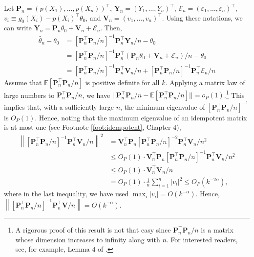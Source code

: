 \documentclass[10.5pt, A4paper, openany, uplatex]{book}
\newcommand{\mbf}{\mathbf}
\newcommand{\mcl}{\mathcal}
\newcommand{\eps}{\varepsilon}
\newcommand{\E}{\mathbb{E}}
\renewcommand{\hat}{\widehat}
\numberwithin{equation}{section}
\begin{document}
Let $\mbf{P}_n = (p(X_1), \ldots, p(X_n))^\top$, $\mbf{Y}_n = (Y_1, \ldots, Y_n)^\top$, $\mcl{E}_n = (\eps_1, \ldots, \eps_n)^\top$, $v_i \equiv g_0(X_i) - p(X_i)^\top \theta_0$, and $\mbf{V}_n = (v_1, \ldots , v_n)^\top$.
Using these notations, we can write $\mbf{Y}_n = \mbf{P}_n \theta_0 + \mbf{V}_n + \mcl{E}_n$.
Then,
\begin{align*}
	\hat \theta_n - \theta_0 
	& = \left[\mbf{P}_n^\top \mbf{P}_n /n \right]^{-1}\mbf{P}_n^\top \mbf{Y}_n /n - \theta_0 \\
	& = \left[\mbf{P}_n^\top \mbf{P}_n /n \right]^{-1}\mbf{P}_n^\top (\mbf{P}_n \theta_0 + \mbf{V}_n + \mcl{E}_n) /n - \theta_0 \\
	& = \left[\mbf{P}_n^\top \mbf{P}_n /n \right]^{-1}\mbf{P}_n^\top \mbf{V}_n /n + \left[\mbf{P}_n^\top \mbf{P}_n /n \right]^{-1}\mbf{P}_n^\top \mcl{E}_n /n 
\end{align*}
Assume that $\E[\mbf{P}_n^\top \mbf{P}_n /n]$ is positive definite for all $k$.
Applying a matrix law of large numbers to $\mbf{P}_n^\top \mbf{P}_n /n$, we have $||\mbf{P}_n^\top \mbf{P}_n /n - \E[\mbf{P}_n^\top \mbf{P}_n /n]|| = o_P(1)$.\footnote{
	A rigorous proof of this result is not that easy since $\mbf{P}_n^\top \mbf{P}_n /n$ is a matrix whose dimension increases to infinity along with $n$.
	For interested readers, see, for example, Lemma 4 of \cite{horowitz2004nonparametric}.
}
This implies that, with a sufficiently large $n$, the minimum eigenvalue of $\left[\mbf{P}_n^\top \mbf{P}_n /n \right]^{-1}$ is $O_P(1)$.
Hence, noting that the maximum eigenvalue of an idempotent matrix is at most one (see Footnote \ref{foot:idempotent}, Chapter 4),
\begin{align*}
	\left\|\left[\mbf{P}_n^\top \mbf{P}_n /n \right]^{-1}\mbf{P}_n^\top \mbf{V}_n /n \right\|^2 
	& = \mbf{V}_n^\top \mbf{P}_n \left[\mbf{P}_n^\top \mbf{P}_n /n \right]^{-2}\mbf{P}_n^\top \mbf{V}_n /n^2 \\
	& \le O_P(1) \cdot \mbf{V}_n^\top \mbf{P}_n \left[\mbf{P}_n^\top \mbf{P}_n /n \right]^{-1}\mbf{P}_n^\top \mbf{V}_n /n^2 \\
	& \le O_P(1) \cdot \mbf{V}_n^\top \mbf{V}_n /n \\
	& = O_P(1) \cdot \frac{1}{n}\sum_{i=1}^n |v_i|^2 \le O_P(k^{-2\alpha}),
\end{align*}
where in the last inequality, we have used $\max_i |v_i| = O(k^{-\alpha})$.
Hence, $\left\|\left[\mbf{P}_n^\top \mbf{P}_n /n \right]^{-1}\mbf{P}_n^\top \mbf{V} /n \right\| = O(k^{-\alpha})$.
\end{document}

